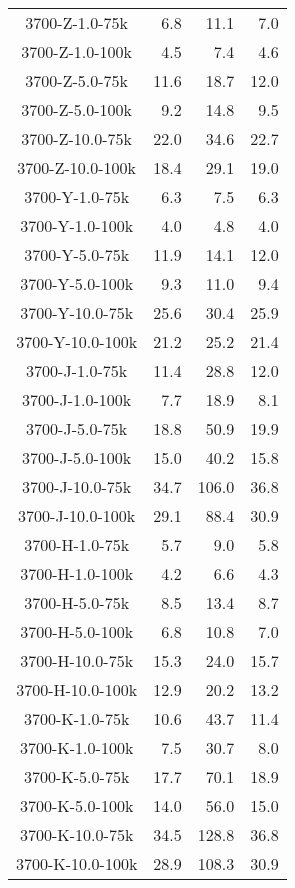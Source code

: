 \begin{longtable}{crrr}
    3700-Z-1.0-75k &   6.8 &   11.1 &   7.0 \\
    3700-Z-1.0-100k &   4.5 &    7.4 &   4.6 \\
    3700-Z-5.0-75k &  11.6 &   18.7 &  12.0 \\
    3700-Z-5.0-100k &   9.2 &   14.8 &   9.5 \\
    3700-Z-10.0-75k &  22.0 &   34.6 &  22.7 \\
    3700-Z-10.0-100k &  18.4 &   29.1 &  19.0 \\
    3700-Y-1.0-75k &   6.3 &    7.5 &   6.3 \\
    3700-Y-1.0-100k &   4.0 &    4.8 &   4.0 \\
    3700-Y-5.0-75k &  11.9 &   14.1 &  12.0 \\
    3700-Y-5.0-100k &   9.3 &   11.0 &   9.4 \\
    3700-Y-10.0-75k &  25.6 &   30.4 &  25.9 \\
    3700-Y-10.0-100k &  21.2 &   25.2 &  21.4 \\
    3700-J-1.0-75k &  11.4 &   28.8 &  12.0 \\
    3700-J-1.0-100k &   7.7 &   18.9 &   8.1 \\
    3700-J-5.0-75k &  18.8 &   50.9 &  19.9 \\
    3700-J-5.0-100k &  15.0 &   40.2 &  15.8 \\
    3700-J-10.0-75k &  34.7 &  106.0 &  36.8 \\
    3700-J-10.0-100k &  29.1 &   88.4 &  30.9 \\
    3700-H-1.0-75k &   5.7 &    9.0 &   5.8 \\
    3700-H-1.0-100k &   4.2 &    6.6 &   4.3 \\
    3700-H-5.0-75k &   8.5 &   13.4 &   8.7 \\
    3700-H-5.0-100k &   6.8 &   10.8 &   7.0 \\
    3700-H-10.0-75k &  15.3 &   24.0 &  15.7 \\
    3700-H-10.0-100k &  12.9 &   20.2 &  13.2 \\
    3700-K-1.0-75k &  10.6 &   43.7 &  11.4 \\
    3700-K-1.0-100k &   7.5 &   30.7 &   8.0 \\
    3700-K-5.0-75k &  17.7 &   70.1 &  18.9 \\
    3700-K-5.0-100k &  14.0 &   56.0 &  15.0 \\
    3700-K-10.0-75k &  34.5 &  128.8 &  36.8 \\
    3700-K-10.0-100k &  28.9 &  108.3 &  30.9 \\

\end{longtable}
